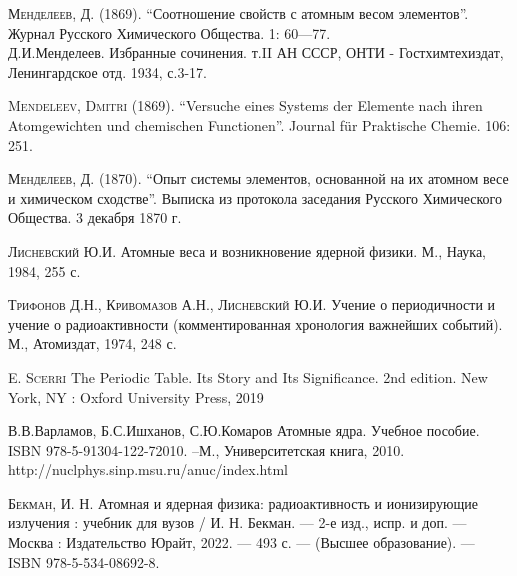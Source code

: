 \documentclass[a5paper,openany]{book}
\begin{document}
	
	\begin{thebibliography}{99}
		

		
		\textsc{Менделеев, Д.} (1869). “Соотношение свойств с атомным весом элементов”. Журнал Русского Химического Общества. 1: 60—77. \\
		Д.И.Менделеев. Избранные сочинения. т.II АН СССР, ОНТИ - Гостхимтехиздат, Ленингардское отд. 1934, с.3-17.		
		
		\textsc{Mendeleev, Dmitri} (1869). “Versuche eines Systems der Elemente nach ihren Atomgewichten und chemischen Functionen”. Journal für Praktische Chemie. 106: 251.
		
		\textsc{Менделеев, Д.} (1870). “Опыт системы элементов, основанной на их атомном весе и химическом сходстве”. Выписка из протокола заседания Русского Химического Общества. 3 декабря 1870 г.
		
		
		\textsc{Лисневский Ю.И.} Атомные веса и возникновение ядерной физики. М., Наука, 1984, 255 с.
		
		\textsc{Трифонов Д.Н., Кривомазов А.Н., Лисневский Ю.И.} Учение о периодичности и учение о радиоактивности (комментированная хронология важнейших событий). М., Атомиздат, 1974, 248 с.

		\textsc{E. Scerri}
		The Periodic Table. Its Story and Its Significance. 
		2nd edition.  New York, NY : Oxford University Press, 2019 

		
		В.В.Варламов, Б.С.Ишханов, С.Ю.Комаров Атомные ядра. Учебное пособие. ISBN 978-5-91304-122-72010. –М., Университетская книга, 2010.
		http://nuclphys.sinp.msu.ru/anuc/index.html
		
\textsc{Бекман, И. Н.}  Атомная и ядерная физика: радиоактивность и ионизирующие излучения : учебник для вузов / И. Н. Бекман. — 2-е изд., испр. и доп. — Москва : Издательство Юрайт, 2022. — 493 с. — (Высшее образование). — ISBN 978-5-534-08692-8. 


\end{thebibliography}
\end{document}
